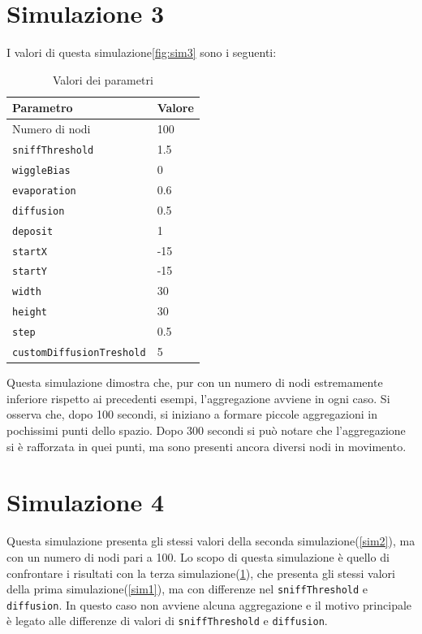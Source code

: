 \section{Simulazione 3}\label{sim3}
I valori di questa simulazione\space \cref{fig:sim3} sono i seguenti:
\begin{table}[ht]
    \centering
    \caption{Valori dei parametri}
    \begin{tabular}{ll}
        \toprule
        Parametro                   & Valore \\
        \midrule
        Numero di nodi              & 100    \\
        \texttt{sniffThreshold}     & 1.5    \\
        \texttt{wiggleBias}         & 0      \\
        \texttt{evaporation}        & 0.6    \\
        \texttt{diffusion}          & 0.5    \\
        \texttt{deposit}            & 1      \\
        \texttt{startX}             & -15    \\
        \texttt{startY}             & -15    \\
        \texttt{width}              & 30     \\
        \texttt{height}             & 30     \\
        \texttt{step}               & 0.5    \\
        \texttt{customDiffusionTreshold} & 5 \\
        \bottomrule
    \end{tabular}\label{tab:parametri3}
\end{table}\newline
Questa simulazione dimostra che, pur con un numero di nodi estremamente inferiore rispetto ai precedenti esempi,
l'aggregazione avviene in ogni caso.
Si osserva che, dopo 100 secondi, si iniziano a formare piccole aggregazioni in pochissimi punti dello spazio.
Dopo 300 secondi si può notare che l'aggregazione si è rafforzata in quei punti, ma sono presenti ancora diversi nodi in movimento.


\section{Simulazione 4}\label{sim4}
Questa simulazione presenta gli stessi valori della seconda simulazione\space(\cref{sim2}), ma con un numero di nodi pari a 100.
Lo scopo di questa simulazione è quello di confrontare i risultati con la terza simulazione\space(\cref{sim3}), che presenta gli stessi valori della prima simulazione\space(\cref{sim1}),
ma con differenze nel \texttt{sniffThreshold} e \texttt{diffusion}. In questo caso non avviene alcuna aggregazione e 
il motivo principale è legato alle differenze di valori di \texttt{sniffThreshold} e \texttt{diffusion}.

